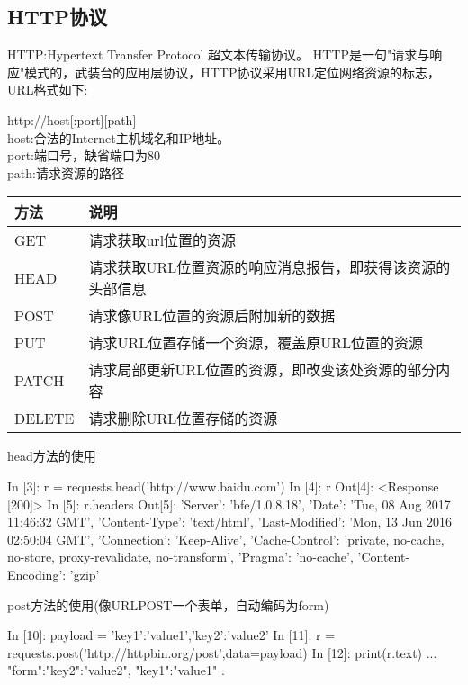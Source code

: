 \subsection{HTTP协议}
HTTP:Hypertext Transfer Protocol 超文本传输协议。\newline
HTTP是一句"请求与响应"模式的，武装台的应用层协议，HTTP协议采用URL定位网络资源的标志，URL格式如下:\newline
\begin{center}
http://host[:port][path]\\
host:合法的Internet主机域名和IP地址。\\
port:端口号，缺省端口为80\\
path:请求资源的路径\\
\end{center}
{}
\begin{center}
\begin{tabular}{|p{3cm}|p{12cm}|}
\hline
方法&说明\\
\hline
GET&请求获取url位置的资源\\
\hline
HEAD&请求获取URL位置资源的响应消息报告，即获得该资源的头部信息\\
\hline
POST&请求像URL位置的资源后附加新的数据\\
\hline
PUT&请求URL位置存储一个资源，覆盖原URL位置的资源\\
\hline
PATCH&请求局部更新URL位置的资源，即改变该处资源的部分内容\\
\hline
DELETE&请求删除URL位置存储的资源\\
\hline
\end{tabular}
\end{center}
head方法的使用
\begin{python}
In [3]: r = requests.head('http://www.baidu.com')
In [4]: r
Out[4]: <Response [200]>
In [5]: r.headers
Out[5]: {'Server': 'bfe/1.0.8.18', 'Date': 'Tue, 08 Aug 2017 11:46:32 GMT', 'Content-Type': 'text/html', 'Last-Modified': 'Mon, 13 Jun 2016 02:50:04 GMT', 'Connection': 'Keep-Alive', 'Cache-Control': 'private, no-cache, no-store, proxy-revalidate, no-transform', 'Pragma': 'no-cache', 'Content-Encoding': 'gzip'}
\end{python}
post方法的使用(像URLPOST一个表单，自动编码为form)
\begin{python}
In [10]: payload = {'key1':'value1','key2':'value2'}
In [11]: r = requests.post('http://httpbin.org/post',data=payload)
In [12]: print(r.text)
{...
 "form":{"key2":"value2",
         "key1":"value1"
 }.
}
\end{python}
